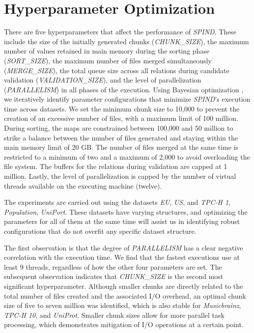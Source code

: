\section{Hyperparameter Optimization}\label{subsec:hyperparameters}

There are five hyperparameters that affect the performance of \textit{SPIND}. These include the size of the initially generated chunks (\textit{CHUNK\_SIZE}), the maximum number of values retained in main memory during the sorting phase (\textit{SORT\_SIZE}), the maximum number of files merged simultaneously (\textit{MERGE\_SIZE}), the total queue size across all relations during candidate validation (\textit{VALIDATION\_SIZE}), and the level of parallelization (\textit{PARALLELISM}) in all phases of the execution. Using Bayesian optimization \cite{shahriari2015taking}, we iteratively identify parameter configurations that minimize \textit{SPIND}'s execution time across datasets. We set the minimum chunk size to 10,000 to prevent the creation of an excessive number of files, with a maximum limit of 100 million. During sorting, the maps are constrained between 100,000 and 50 million to strike a balance between the number of files generated and staying within the main memory limit of 20 GB. The number of files merged at the same time is restricted to a minimum of two and a maximum of 2,000 to avoid overloading the file system. The buffers for the relations during validation are capped at 1 million. Lastly, the level of parallelization is capped by the number of virtual threads available on the executing machine (twelve).

The experiments are carried out using the datasets \textit{EU}, \textit{US}, and \textit{TPC-H 1}, \textit{Population}, \textit{UniPort}. These datasets have varying structures, and optimizing the parameters for all of them at the same time will assist us in identifying robust configurations that do not overfit any specific dataset structure. 

The first observation is that the degree of \textit{PARALLELISM} has a clear negative correlation with the execution time. We find that the fastest executions use at least 9 threads, regardless of how the other four parameters are set. The subsequent observation indicates that \textit{CHUNK\_SIZE} is the second most significant hyperparameter. Although smaller chunks are directly related to the total number of files created and the associated I/O overhead, an optimal chunk size of five to seven million was identified, which is also stable for \textit{Musicbrainz}, \textit{TPC-H 10}, and \textit{UniProt}. Smaller chunk sizes allow for more parallel task processing, which demonstrates mitigation of I/O operations at a certain point.

